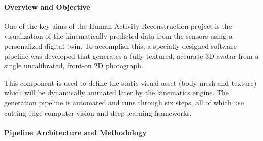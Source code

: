 \documentclass[12pt, a4paper, oneside]{report}
\begin{document}
\paragraph{Overview and Objective}
\noindent One of the key aims of the Human Activity Reconstruction project is the visualization of the kinematically predicted data from the sensors using a personalized digital twin. To accomplish this, a specially-designed software pipeline was developed that generates a fully textured, accurate 3D avatar from a single uncalibrated, front-on 2D photograph.

\noindent This component is used to define the static visual asset (body mesh and texture) which will be dynamically animated later by the kinematics engine. The generation pipeline is automated and runs through six steps, all of which use cutting edge computer vision and deep learning frameworks.






\paragraph{Pipeline Architecture and Methodology}
\end{document}
